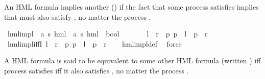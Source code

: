 \begin{isabellebody}
\begin{isamarkuptext}%
An HML formula  implies another () if the fact that some process  satisfies 
implies that  must also satisfy , no matter the process .%
\end{isamarkuptext}\isamarkuptrue%
\isamarkupfalse%
\ hml{\isacharunderscore}{\kern0pt}impl\ {\isacharcolon}{\kern0pt}{\isacharcolon}{\kern0pt}\ {\isachardoublequoteopen}{\isacharparenleft}{\kern0pt}{\isacharprime}{\kern0pt}a{\isacharcomma}{\kern0pt}\ {\isacharprime}{\kern0pt}s{\isacharparenright}{\kern0pt}\ hml\ {\isasymRightarrow}\ {\isacharparenleft}{\kern0pt}{\isacharprime}{\kern0pt}a{\isacharcomma}{\kern0pt}\ {\isacharprime}{\kern0pt}s{\isacharparenright}{\kern0pt}\ hml\ {\isasymRightarrow}\ bool{\isachardoublequoteclose}\ {\isacharparenleft}{\kern0pt}\ {\isachardoublequoteopen}{\isasymRrightarrow}{\isachardoublequoteclose}\ {}{}{\isacharparenright}{\kern0pt}\ \ \isanewline
\ \ {\isachardoublequoteopen}{\isasymphi}l\ {\isasymRrightarrow}\ {\isasymphi}r\ {\isasymequiv}\ {\isacharparenleft}{\kern0pt}{\isasymforall}p{\isachardot}{\kern0pt}\ {\isacharparenleft}{\kern0pt}p\ {\isasymTurnstile}\ {\isasymphi}l{\isacharparenright}{\kern0pt}\ {\isasymlongrightarrow}\ {\isacharparenleft}{\kern0pt}p\ {\isasymTurnstile}\ {\isasymphi}r{\isacharparenright}{\kern0pt}{\isacharparenright}{\kern0pt}{\isachardoublequoteclose}\isanewline
\isanewline
{}\isamarkupfalse%
\ hml{\isacharunderscore}{\kern0pt}impl{\isacharunderscore}{\kern0pt}iffI{\isacharcolon}{\kern0pt}\ {\isachardoublequoteopen}{\isasymphi}l\ {\isasymRrightarrow}\ {\isasymphi}r\ {\isacharequal}{\kern0pt}\ {\isacharparenleft}{\kern0pt}{\isasymforall}p{\isachardot}{\kern0pt}\ {\isacharparenleft}{\kern0pt}p\ {\isasymTurnstile}\ {\isasymphi}l{\isacharparenright}{\kern0pt}\ {\isasymlongrightarrow}\ {\isacharparenleft}{\kern0pt}p\ {\isasymTurnstile}\ {\isasymphi}r{\isacharparenright}{\kern0pt}{\isacharparenright}{\kern0pt}{\isachardoublequoteclose}\isanewline
%
\isadelimproof
\ \ %
\endisadelimproof
%
\isatagproof
{}\isamarkupfalse%
\ hml{\isacharunderscore}{\kern0pt}impl{\isacharunderscore}{\kern0pt}def\ \isamarkupfalse%
\ force%
\endisatagproof
{\isafoldproof}%
%
\isadelimproof
%
\endisadelimproof
%
\isadelimdocument
%
\endisadelimdocument
%
\isatagdocument
%
\isamarkuptrue%
%
\endisatagdocument
{\isafolddocument}%
%
\isadelimdocument
%
\endisadelimdocument
%
\begin{isamarkuptext}%
A HML formula  is said to be equivalent to some other HML formula  (written )
iff process  satisfies  iff it also satisfies , no matter the process .


\end{isamarkuptext}
\end{isabellebody}
